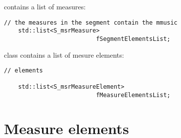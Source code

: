  contains a list of measures:
\begin{lstlisting}[language=CPlusPlus]
    // the measures in the segment contain the mmusic
    std::list<S_msrMeasure>    
                          fSegmentElementsList;
\end{lstlisting}

class   {\tt } contains a list of mesure elements:
\begin{lstlisting}[language=CPlusPlus]
    // elements

    std::list<S_msrMeasureElement>
                          fMeasureElementsList;
\end{lstlisting}


\section{Measure elements}

